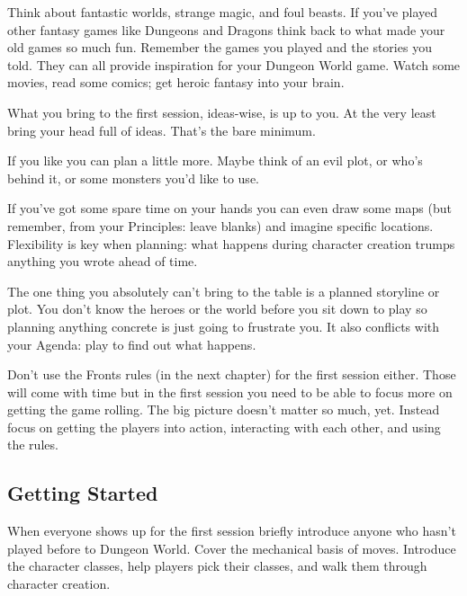        

Think about fantastic worlds, strange magic, and foul beasts. If you've played other fantasy games like Dungeons and Dragons think back to what made your old games so much fun. Remember the games you played and the stories you told. They can all provide inspiration for your Dungeon World game. Watch some movies, read some comics; get heroic fantasy into your brain.

       

What you bring to the first session, ideas-wise, is up to you. At the very least bring your head full of ideas. That's the bare minimum.

       

If you like you can plan a little more. Maybe think of an evil plot, or who's behind it, or some monsters you'd like to use.

       

If you've got some spare time on your hands you can even draw some maps (but remember, from your Principles: leave blanks) and imagine specific locations. Flexibility is key when planning: what happens during character creation trumps anything you wrote ahead of time.

       

The one thing you absolutely can't bring to the table is a planned storyline or plot. You don't know the heroes or the world before you sit down to play so planning anything concrete is just going to frustrate you. It also conflicts with your Agenda: play to find out what happens.

       

Don't use the Fronts rules (in the next chapter) for the first session either. Those will come with time but in the first session you need to be able to focus more on getting the game rolling. The big picture doesn't matter so much, yet. Instead focus on getting the players into action, interacting with each other, and using the rules.

       
\subsection{Getting Started}   
       

When everyone shows up for the first session briefly introduce anyone who hasn't played before to Dungeon World. Cover the mechanical basis of moves. Introduce the character classes, help players pick their classes, and walk them through character creation.


